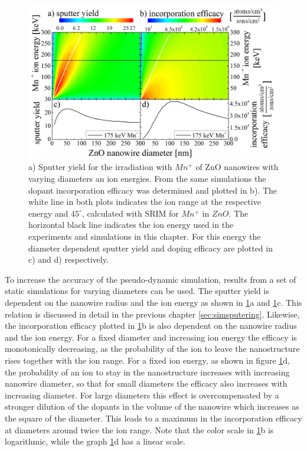 \begin{figure}
	\centering
		\includegraphics[width=.8\textwidth]{images/sputterincorporate.png}
	\caption{a) Sputter yield for the irradiation with $Mn^+$ of ZnO nanowires with varying diameters an ion energies. From the same simulations the dopant incorporation efficacy was determined and plotted in b). The white line in both plots indicates the ion range at the respective energy and $45^\circ$, calculated with SRIM for $Mn^+$ in $ZnO$. The horizontal black line indicates the ion energy used in the experiments and simulations in this chapter. For this energy the diameter dependent sputter yield and doping efficacy are plotted in c) and d) respectively.}
	\label{sputterincorporate}
\end{figure} 

To increase the accuracy of the pseudo-dynamic simulation, results from a set of static simulations for varying diameters can be used. The sputter yield is dependent on the nanowire radius and the ion energy as shown in \ref{sputterincorporate}a and \ref{sputterincorporate}c. This relation is discussed in detail in the previous chapter \ref{sec:simsputering}. Likewise, the incorporation efficacy plotted in \ref{sputterincorporate}b is also dependent on the nanowire radius and the ion energy. For a fixed diameter and increasing ion energy the efficacy is monotonically decreasing, as the probability of the ion to leave the nanostructure rises together with the ion range. For a fixed ion energy, as shown in figure \ref{sputterincorporate}d, the probability of an ion to stay in the nanostructure increases with increasing nanowire diameter, so that for small diameters the efficacy also increases with increasing diameter. For large diameters this effect is overcompensated by a stronger dilution of the dopants in the volume of the nanowire which increases as the square of the diameter. This leads to a maximum in the incorporation efficacy at diameters around twice the ion range. Note that the color scale in \ref{sputterincorporate}b is logarithmic, while the graph \ref{sputterincorporate}d has a linear scale.



